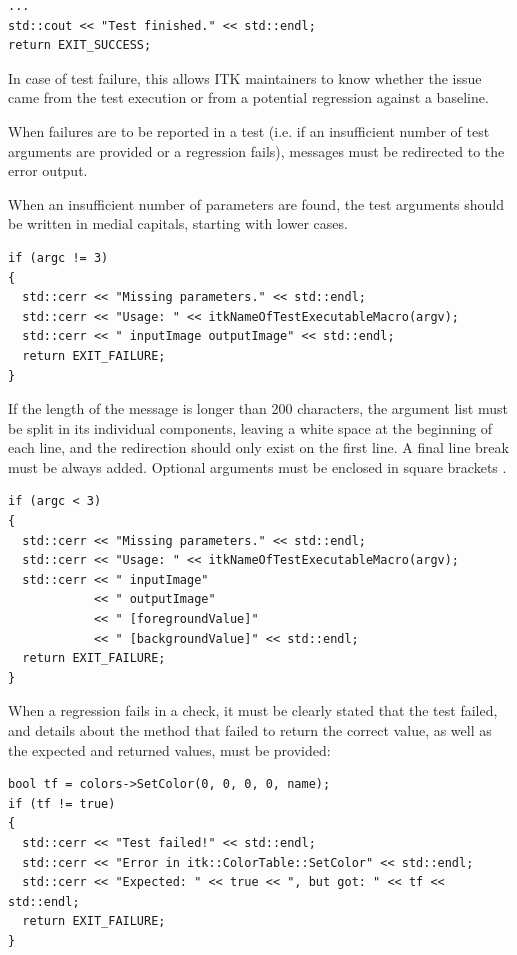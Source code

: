 \small
\begin{verbatim}
...
std::cout << "Test finished." << std::endl;
return EXIT_SUCCESS;
\end{verbatim}
\normalsize

In case of test failure, this allows ITK maintainers to know whether the issue
came from the test execution or from a potential regression against a baseline.

When failures are to be reported in a test (i.e. if an insufficient number of
test arguments are provided or a regression fails), messages must be redirected
to the error output.

When an insufficient number of parameters are found, the test arguments should
be written in medial capitals, starting with lower cases.

\small
\begin{verbatim}
if (argc != 3)
{
  std::cerr << "Missing parameters." << std::endl;
  std::cerr << "Usage: " << itkNameOfTestExecutableMacro(argv);
  std::cerr << " inputImage outputImage" << std::endl;
  return EXIT_FAILURE;
}
\end{verbatim}
\normalsize

If the length of the message is longer than 200 characters, the argument list
must be split in its individual components, leaving a white space at the
beginning of each line, and the  redirection should only
exist on the first line. A final line break must be always added. Optional
arguments must be enclosed in square brackets \code{[]}.

\small
\begin{verbatim}
if (argc < 3)
{
  std::cerr << "Missing parameters." << std::endl;
  std::cerr << "Usage: " << itkNameOfTestExecutableMacro(argv);
  std::cerr << " inputImage"
            << " outputImage"
            << " [foregroundValue]"
            << " [backgroundValue]" << std::endl;
  return EXIT_FAILURE;
}
\end{verbatim}
\normalsize

When a regression fails in a check, it must be clearly stated that the test
failed, and details about the method that failed to return the correct value,
as well as the expected and returned values, must be provided:

\small
\begin{verbatim}
bool tf = colors->SetColor(0, 0, 0, 0, name);
if (tf != true)
{
  std::cerr << "Test failed!" << std::endl;
  std::cerr << "Error in itk::ColorTable::SetColor" << std::endl;
  std::cerr << "Expected: " << true << ", but got: " << tf << std::endl;
  return EXIT_FAILURE;
}
\end{verbatim}
\normalsize

